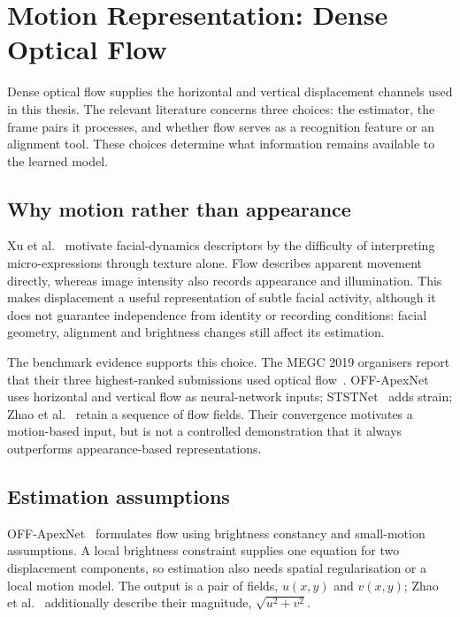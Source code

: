 
\section{Motion Representation: Dense Optical Flow}
\label{sec:flow-review}

Dense optical flow supplies the horizontal and vertical displacement channels used in this thesis. The relevant literature concerns three choices: the estimator, the frame pairs it processes, and whether flow serves as a recognition feature or an alignment tool. These choices determine what information remains available to the learned model.

\subsection{Why motion rather than appearance}
\label{sec:why-flow}

Xu et al.~\cite{xu2017} motivate facial-dynamics descriptors by the difficulty of interpreting micro-expressions through texture alone. Flow describes apparent movement directly, whereas image intensity also records appearance and illumination. This makes displacement a useful representation of subtle facial activity, although it does not guarantee independence from identity or recording conditions: facial geometry, alignment and brightness changes still affect its estimation.

The benchmark evidence supports this choice. The MEGC 2019 organisers report that their three highest-ranked submissions used optical flow~\cite{see2019}. OFF-ApexNet~\cite{liong2019a} uses horizontal and vertical flow as neural-network inputs; STSTNet~\cite{liong2019b} adds strain; Zhao et al.~\cite{zhaoS2021} retain a sequence of flow fields. Their convergence motivates a motion-based input, but is not a controlled demonstration that it always outperforms appearance-based representations.

\subsection{Estimation assumptions}
\label{sec:brightness-constancy}

OFF-ApexNet~\cite{liong2019a} formulates flow using brightness constancy and small-motion assumptions. A local brightness constraint supplies one equation for two displacement components, so estimation also needs spatial regularisation or a local motion model. The output is a pair of fields, $u(x,y)$ and $v(x,y)$; Zhao et al.~\cite{zhaoS2021} additionally describe their magnitude, $\sqrt{u^2+v^2}$.

